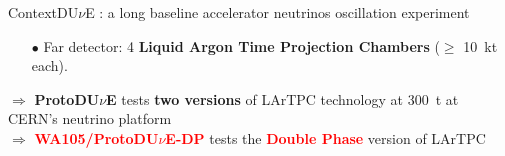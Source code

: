 \documentclass[10pt]{beamer}
\begin{document}
\begin{frame}{Context}{DU$\nu$E : a long baseline accelerator neutrinos oscillation experiment}
\begin{scriptsize}
\begin{minipage}{0.38\textwidth}
\begin{itemize}
\begin{itemize}
	    				\item[$\bullet$] Mass hierarchy;
	    				\item[$\bullet$] Proton lifetime;
	    				\item[$\bullet$] Supernovae neutrinos.
	    			\end{itemize}
    			\item[$\bullet$] Far detector: 4 \textbf{Liquid Argon Time Projection Chambers} 
    			($\geq$ \SI{10}{\kilo\tonne} each).
    		\end{itemize}
    		\vspace{.3cm}
    		$\Rightarrow$ \textbf{ProtoDU$\nu$E} tests \textbf{two versions} of LArTPC technology at \SI{300}{\tonne} at CERN's neutrino platform\\
    		
    		$\Rightarrow$ \textcolor{red}{\textbf{WA105/ProtoDU$\nu$E-DP}} tests the \textcolor{red}{\textbf{Double Phase}} version of LArTPC 
	    \end{minipage}
	\end{scriptsize}
    \end{frame}
    
\end{document}
